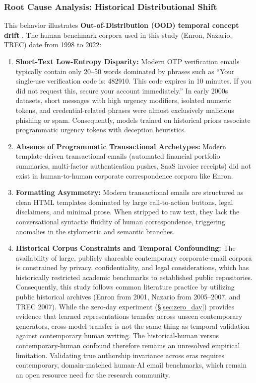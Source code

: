 \documentclass[journal]{IEEEtran}
\begin{document}
\subsubsection{Root Cause Analysis: Historical Distributional Shift}
This behavior illustrates \textbf{Out-of-Distribution (OOD) temporal concept drift} \cite{gama2014conceptdrift, pendlebury2019tesseract}. The human benchmark corpora used in this study (Enron, Nazario, TREC) date from 1998 to 2022:
\begin{enumerate}
    \item \textbf{Short-Text Low-Entropy Disparity:} Modern OTP verification emails typically contain only 20--50 words dominated by phrases such as ``Your single-use verification code is: 482910. This code expires in 10 minutes. If you did not request this, secure your account immediately.'' In early 2000s datasets, short messages with high urgency modifiers, isolated numeric tokens, and credential-related phrases were almost exclusively malicious phishing or spam. Consequently, models trained on historical priors associate programmatic urgency tokens with deception heuristics.
    \item \textbf{Absence of Programmatic Transactional Archetypes:} Modern template-driven transactional emails (automated financial portfolio summaries, multi-factor authentication pushes, SaaS invoice receipts) did not exist in human-to-human corporate correspondence corpora like Enron.
    \item \textbf{Formatting Asymmetry:} Modern transactional emails are structured as clean HTML templates dominated by large call-to-action buttons, legal disclaimers, and minimal prose. When stripped to raw text, they lack the conversational syntactic fluidity of human correspondence, triggering anomalies in the stylometric and semantic branches.
    \item \textbf{Historical Corpus Constraints and Temporal Confounding:} The availability of large, publicly shareable contemporary corporate-email corpora is constrained by privacy, confidentiality, and legal considerations, which has historically restricted academic benchmarks to established public repositories. Consequently, this study follows common literature practice by utilizing public historical archives (Enron from 2001, Nazario from 2005--2007, and TREC 2007). While the zero-day experiment (\S\ref{sec:zero_day}) provides evidence that learned representations transfer across unseen contemporary generators, cross-model transfer is not the same thing as temporal validation against contemporary human writing. The historical-human versus contemporary-human confound therefore remains an unresolved empirical limitation. Validating true authorship invariance across eras requires contemporary, domain-matched human-AI email benchmarks, which remain an open resource need for the research community.
\end{enumerate}
\end{document}
